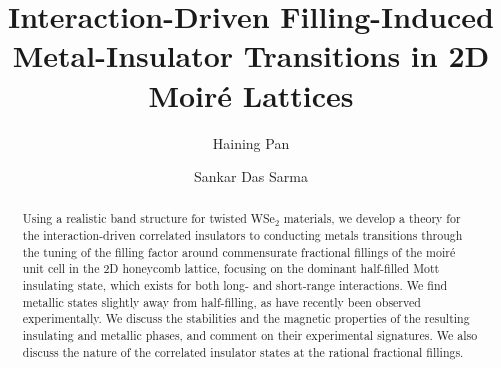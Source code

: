 \documentclass[aps,prl,floatfix,twocolumn]{revtex4-2}
\begin{document}
	\title{Interaction-Driven Filling-Induced Metal-Insulator Transitions in 2D Moir\'e Lattices}
	
	\author{Haining Pan}

	\author{Sankar Das Sarma}
	
\begin{abstract}
	Using a realistic band structure for twisted WSe$_2 $ materials, we develop a theory for the interaction-driven correlated insulators to conducting metals transitions through the tuning of the filling factor around commensurate fractional fillings of the moir\'e unit cell in the 2D honeycomb lattice, focusing on the dominant half-filled Mott insulating state, which exists for both long- and short-range interactions.  We find metallic states slightly away from half-filling, as have recently been observed experimentally.  We discuss the stabilities and the magnetic properties of the resulting insulating and metallic phases, and comment on their experimental signatures. {We also discuss the nature of the correlated insulator states at the rational fractional fillings.}
\end{abstract}
\maketitle
\end{document}
